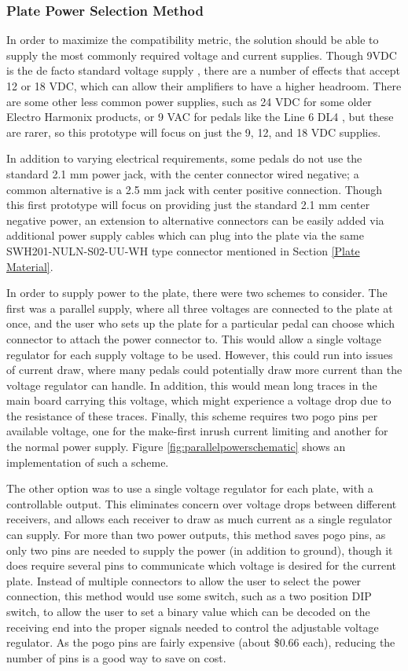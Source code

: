 \documentclass{article}
\begin{document}
		\subsubsection{Plate Power Selection Method}
		In order to maximize the compatibility metric, the solution should be able to supply the most commonly required voltage and current supplies.  Though 9VDC is the de facto standard voltage supply \cite{pedallsit}, there are a number of effects that accept 12 or 18 VDC, which can allow their amplifiers to have a higher headroom.  There are some other less common power supplies, such as 24 VDC for some older Electro Harmonix products, or 9 VAC for pedals like the Line 6 DL4 \cite{Line6DL4manual}, but these are rarer, so this prototype will focus on just the 9, 12, and 18 VDC supplies.

		In addition to varying electrical requirements, some pedals do not use the standard 2.1 mm power jack, with the center connector wired negative; a common alternative is a 2.5 mm jack with center positive connection.  Though this first prototype will focus on providing just the standard 2.1 mm center negative power, an extension to alternative connectors can be easily added via additional power supply cables which can plug into the plate via the same SWH201-NULN-S02-UU-WH type connector mentioned in Section \ref{Plate Material}.

		In order to supply power to the plate, there were two schemes to consider.  The first was a parallel supply, where all three voltages are connected to the plate at once, and the user who sets up the plate for a particular pedal can choose which connector to attach the power connector to.  This would allow a single voltage regulator for each supply voltage to be used.  However, this could run into issues of current draw, where many pedals could potentially draw more current than the voltage regulator can handle.  In addition, this would mean long traces in the main board carrying this voltage, which might experience a voltage drop due to the resistance of these traces.  Finally, this scheme requires two pogo pins per available voltage, one for the make-first inrush current limiting and another for the normal power supply.  Figure \ref{fig:parallelpowerschematic} shows an implementation of such a scheme.


		The other option was to use a single voltage regulator for each plate, with a controllable output.  This eliminates concern over voltage drops between different receivers, and allows each receiver to draw as much current as a single regulator can supply.  For more than two power outputs, this method saves pogo pins, as only two pins are needed to supply the power (in addition to ground), though it does require several pins to communicate which voltage is desired for the current plate.  Instead of multiple connectors to allow the user to select the power connection, this method would use some switch, such as a two position DIP switch, to allow the user to set a binary value which can be decoded on the receiving end into the proper signals needed to control the adjustable voltage regulator.  As the pogo pins are fairly expensive (about \$0.66 each), reducing the number of pins is a good way to save on cost.
\end{document}
